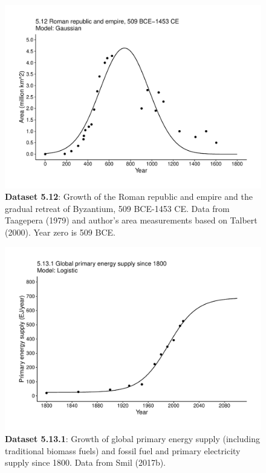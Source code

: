 \documentclass[aps,rmp,preprint,superscriptaddress,10pt,onecolumn]{article}
\begin{document}
\clearpage
\begin{figure}[h]
\includegraphics[width=\textwidth]{output/figs-ggplot/5.12.pdf}
\caption{\textbf{Dataset 5.12}: Growth of the Roman republic and empire and the gradual retreat of Byzantium, 509 BCE-1453 CE. Data from Taagepera (1979) and author's area measurements based on Talbert (2000). Year zero is 509 BCE. }
\end{figure}
	
\clearpage
\begin{figure}[h]
\includegraphics[width=\textwidth]{output/figs-ggplot/5.13.1.pdf}
\caption{\textbf{Dataset 5.13.1}: Growth of global primary energy supply (including traditional biomass fuels) and fossil fuel and primary electricity supply since 1800. Data from Smil (2017b). }
\end{figure}
	
\end{document}
